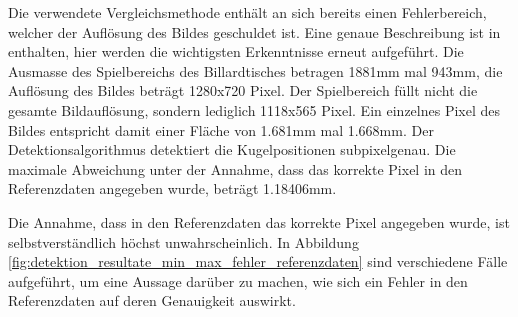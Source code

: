 Die verwendete Vergleichsmethode enthält an sich bereits einen Fehlerbereich, welcher der Auflösung des Bildes geschuldet ist.
Eine genaue Beschreibung ist in \cite{project2:fehler_grundwahrheit} enthalten, hier werden die wichtigsten Erkenntnisse
erneut aufgeführt.
Die Ausmasse des Spielbereichs des Billardtisches betragen 1881mm mal 943mm, die Auflösung des Bildes beträgt 1280x720 Pixel.
Der Spielbereich füllt nicht die gesamte Bildauflösung, sondern lediglich 1118x565 Pixel.
Ein einzelnes Pixel des Bildes entspricht damit einer Fläche von 1.681mm mal 1.668mm.
Der Detektionsalgorithmus detektiert die Kugelpositionen subpixelgenau.
Die maximale Abweichung unter der Annahme, dass das korrekte Pixel in den Referenzdaten angegeben wurde, beträgt 1.18406mm.

Die Annahme, dass in den Referenzdaten das korrekte Pixel angegeben wurde, ist selbstverständlich höchst unwahrscheinlich.
In Abbildung \ref{fig:detektion_resultate_min_max_fehler_referenzdaten} sind verschiedene Fälle aufgeführt,
um eine Aussage darüber zu machen, wie sich ein Fehler in den Referenzdaten auf deren Genauigkeit auswirkt.

